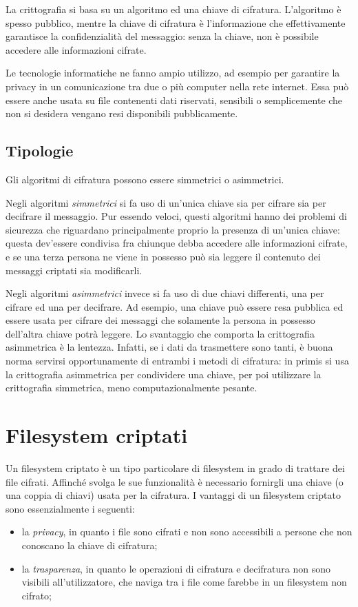 \documentclass[a4paper,12pt,twoside,openright]{report}
\begin{document}
  La crittografia si basa su un algoritmo ed una chiave di cifratura. L'algoritmo è spesso pubblico, mentre
  la chiave di cifratura è l'informazione che effettivamente garantisce la confidenzialità del messaggio:
  senza la chiave, non è possibile accedere alle informazioni cifrate.

  Le tecnologie informatiche ne fanno ampio utilizzo, ad esempio per
  garantire la privacy in un comunicazione tra due o più computer nella rete internet. 
  Essa può essere anche usata su file contenenti dati riservati, sensibili o semplicemente che non
  si desidera vengano resi disponibili pubblicamente.

  \subsection{Tipologie}

  Gli algoritmi di cifratura possono essere simmetrici o asimmetrici.

  Negli algoritmi \textit{simmetrici} si fa uso di un'unica chiave sia per cifrare sia per decifrare il messaggio.
  Pur essendo veloci, questi algoritmi hanno dei problemi di sicurezza che riguardano principalmente 
  proprio la presenza di un'unica chiave: questa dev'essere condivisa fra chiunque debba accedere alle
  informazioni cifrate, e se una terza persona ne viene in possesso può sia leggere il contenuto dei
  messaggi criptati sia modificarli.

  Negli algoritmi \textit{asimmetrici} invece si fa uso di due chiavi differenti, una per cifrare ed una per decifrare.
  Ad esempio, una chiave può essere resa pubblica ed essere usata per cifrare dei messaggi che solamente la persona
  in possesso dell'altra chiave potrà leggere.
  Lo svantaggio che comporta la crittografia asimmetrica è la lentezza.
  Infatti, se i dati da trasmettere sono tanti, è buona norma servirsi opportunamente di entrambi i metodi
  di cifratura: in primis si usa la crittografia asimmetrica per condividere una chiave, per poi utilizzare
  la crittografia simmetrica, meno computazionalmente pesante.

  \section{Filesystem criptati}

  Un filesystem criptato è un tipo particolare di filesystem in grado di trattare dei file cifrati.
  Affinché svolga le sue funzionalità è necessario fornirgli una chiave
  (o una coppia di chiavi) usata per la cifratura.
  I vantaggi di un filesystem criptato sono essenzialmente i seguenti:
  \begin{itemize}
    \item la \textit{privacy}, in quanto i file sono cifrati e non sono accessibili a persone che non conoscano la chiave di cifratura;
    \item la \textit{trasparenza}, in quanto le operazioni di cifratura e decifratura non sono visibili all'utilizzatore, che naviga tra i file come farebbe in un filesystem non cifrato;
  \end{itemize}
\end{document}
